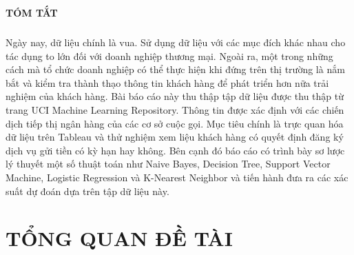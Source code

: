 \documentclass{report}
\begin{document}
\begin{center}
	\fontsize{16}{20}\selectfont
	\textbf{TÓM TẮT}\\
	\end{center}
	\fontsize{13}{15}\selectfont
	\paragraph{}
	Ngày nay, dữ liệu chính là vua. Sử dụng dữ liệu với các mục đích khác nhau cho tác dụng to lớn đối với doanh nghiệp thương mại. Ngoài ra, một trong những cách mà tổ chức doanh nghiệp có thể thực hiện khi đứng trên thị trường là nắm bắt và kiểm tra thành thạo thông tin khách hàng để phát triển hơn nữa trải nghiệm của khách hàng. Bài báo cáo này thu thập tập dữ liệu được thu thập từ trang UCI Machine Learning Repository. Thông tin được xác định với các chiến dịch tiếp thị ngân hàng của các cơ sở cuộc gọi. Mục tiêu chính là trực quan hóa dữ liệu trên Tableau và thử nghiệm xem liệu khách hàng có quyết định đăng ký dịch vụ gửi tiền có kỳ hạn hay không. Bên cạnh đó báo cáo có trình bày sơ lược lý thuyết một số thuật toán như Naive Bayes, Decision Tree, Support Vector Machine, Logistic Regression và K-Nearest Neighbor và tiến hành đưa ra các xác suất dự đoán dựa trên tập dữ liệu này.


\fontsize{13}{15}\selectfont

\pagebreak


\fontsize{13}{20}\selectfont
\tableofcontents
\pagebreak


\fontsize{13}{20}\selectfont
\listoffigures
\pagebreak

\setcounter{page}{1}
\fontsize{16}{10}\selectfont
\chapter{TỔNG QUAN ĐỀ TÀI}
\fontsize{14}{10}\selectfont
\end{document}

